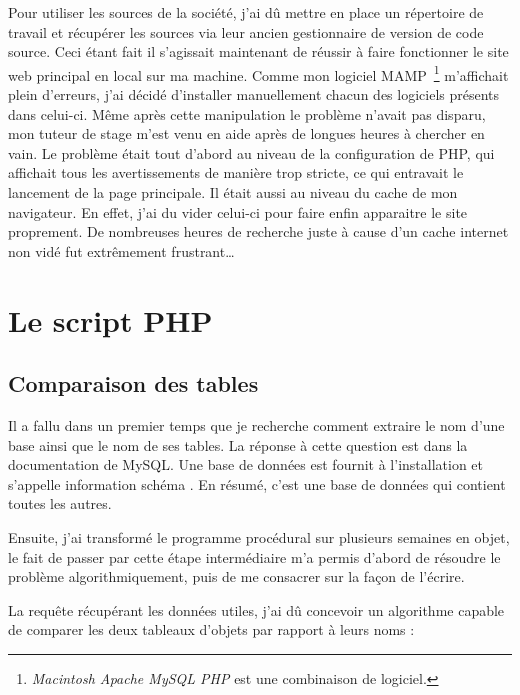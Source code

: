 Pour utiliser les sources de la société, j'ai dû mettre en place un
répertoire de travail et récupérer les sources via leur ancien
gestionnaire de version de code source. Ceci étant fait il s'agissait
maintenant de réussir à faire fonctionner le site web principal en local
sur ma machine. Comme mon logiciel MAMP\, \footnote{\emph{Macintosh
Apache MySQL PHP} est une combinaison de logiciel.} m'affichait plein
d'erreurs, j'ai décidé d'installer manuellement chacun des logiciels
présents dans celui-ci. Même après cette manipulation le problème
n'avait pas disparu, mon tuteur de stage m'est venu en aide après de
longues heures à chercher en vain. Le problème était tout d'abord au
niveau de la configuration de PHP, qui affichait tous les avertissements
de manière trop stricte, ce qui entravait le lancement de la page
principale. Il était aussi au niveau du cache de mon navigateur. En
effet, j'ai du vider celui-ci pour faire enfin apparaitre le site
proprement. De nombreuses heures de recherche juste à cause d'un cache
internet non vidé fut extrêmement frustrant\dots

\section{Le script PHP} %
\label{sec:Le script PHP}

    \subsection{Comparaison des tables} %
    \label{sub:Comparaison des tables}

    Il a fallu dans un premier temps que je recherche comment extraire le
    nom d'une base ainsi que le nom de ses tables. La réponse à cette
    question est dans la documentation de MySQL. Une base de données est
    fournit à l'installation et s'appelle \og information schéma \fg{} . En
    résumé, c'est une base de données qui contient toutes les autres.

    Ensuite, j'ai transformé le programme procédural sur plusieurs semaines
    en objet, le fait de passer par cette étape intermédiaire m'a permis
    d'abord de résoudre le problème algorithmiquement, puis de me consacrer
    sur la façon de l'écrire.

    La requête récupérant les données utiles, j'ai dû concevoir un
    algorithme capable de comparer les deux tableaux d'objets par rapport à
    leurs noms :

